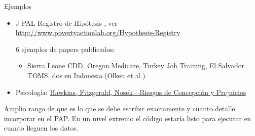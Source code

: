 \documentclass{beamer}
\begin{document}
\begin{frame}{Ejemplos}

\begin{itemize}[<.->]
\item
J-PAL Registro de Hipótesis , ver \url{http://www.povertyactionlab.org/Hypothesis-Registry}

6 ejemplos de papers publicados:
\begin{itemize}
\item
 Sierra Leone CDD, Oregon Medicare, Turkey Job Training, El Salvador TOMS, dos en Indonesia (Olken et al.)
\end{itemize}
\item Psicología: \href{http://pss.sagepub.com/content/26/2/249}{Hawkins, Fitzgerald, Nosek---Riesgos de Concepción y Prejuicios}
\end{itemize} 
\vspace{0.25in}

Amplio rango de que es lo que se debe escribir exactamente y cuanto detalle incorporar en el PAP. En un nivel extremo el código estaría listo para ejecutar en cuanto lleguen los datos.
\end{frame}

{ %
    \begin{frame}[plain]
     \end{frame}
}
\end{document}

